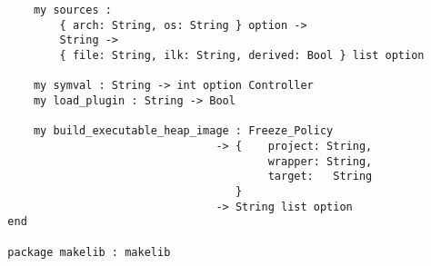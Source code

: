 \begin{small}
\begin{verbatim}
      my sources :
          { arch: String, os: String } option ->
          String ->
          { file: String, ilk: String, derived: Bool } list option

      my symval : String -> int option Controller
      my load_plugin : String -> Bool

      my build_executable_heap_image : Freeze_Policy
                                  -> {    project: String,
                                          wrapper: String,
                                          target:   String
                                     }
                                  -> String list option
  end

  package makelib : makelib
\end{verbatim}
\end{small}
